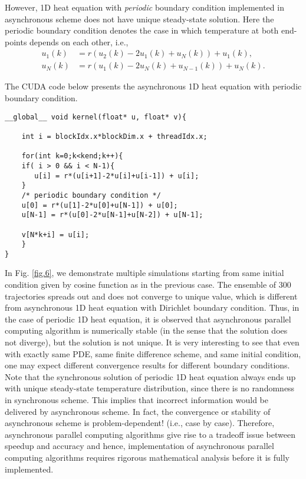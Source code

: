 \documentclass[1p]{elsarticle}
\begin{document}
However, 1D heat equation with \textit{periodic} boundary condition implemented in asynchronous scheme does not have unique steady-state solution. Here the periodic boundary condition denotes the case in which temperature at both end-points depends on each other, i.e.,
\begin{align*}
u_1(k) &= r(u_2(k) - 2u_1(k) + u_N(k)) + u_1(k),\\
u_N(k) &= r(u_1(k) - 2u_N(k) + u_{N-1}(k)) + u_N(k).
\end{align*}

The \textsf{CUDA} code below presents the asynchronous 1D heat equation with periodic boundary condition.

\begin{lstlisting}
__global__ void kernel(float* u, float* v){

    int i = blockIdx.x*blockDim.x + threadIdx.x;
  
    for(int k=0;k<kend;k++){
	if( i > 0 && i < N-1){
	   u[i] = r*(u[i+1]-2*u[i]+u[i-1]) + u[i];
	}
	/* periodic boundary condition */
	u[0] = r*(u[1]-2*u[0]+u[N-1]) + u[0];
	u[N-1] = r*(u[0]-2*u[N-1]+u[N-2]) + u[N-1];
	
	v[N*k+i] = u[i];
    }
}
\end{lstlisting}

In Fig. \ref{fig.6}, we demonstrate multiple simulations starting from same initial condition given by cosine function as in the previous case. The ensemble of 300 trajectories spreads out and does not converge to unique value, which is different from asynchronous 1D heat equation with Dirichlet boundary condition. Thus, in the case of periodic 1D heat equation, it is observed that asynchronous parallel computing algorithm is numerically stable (in the sense that the solution does not diverge), but the solution is not unique.
It is very interesting to see that even with exactly same PDE, same finite difference scheme, and same initial condition, one may expect different convergence results for different boundary conditions.
Note that the synchronous solution of periodic 1D heat equation always ends up with unique steady-state temperature distribution, since there is no randomness in synchronous scheme. This implies that incorrect information would be delivered 
by asynchronous scheme. In fact, the convergence or stability of asynchronous scheme is problem-dependent! (i.e., case by case). Therefore, asynchronous parallel computing algorithms give rise to a tradeoff issue between speedup and accuracy and hence, implementation of asynchronous parallel computing algorithms requires rigorous mathematical analysis before it is fully implemented.




\end{document}
